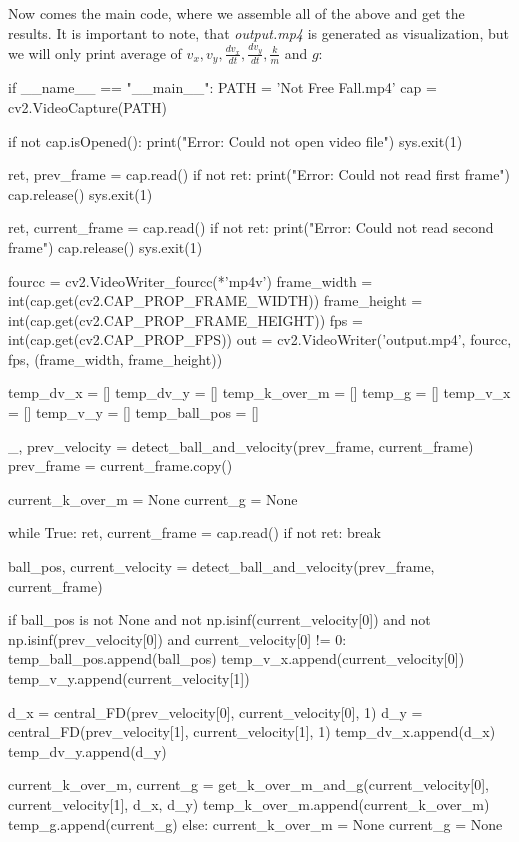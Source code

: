 \documentclass{article}
\begin{document}
Now comes the main code, where we assemble all of the above and get the results. It is important to note, that \textit{output.mp4} is generated as visualization, but we will only print average of $v_x, v_y, \frac{dv_x}{dt}, \frac{dv_y}{dt}, \frac{k}{m}$ and $g$:
\begin{python}
if __name__ == "__main__":
	PATH = 'Not Free Fall.mp4'
	cap = cv2.VideoCapture(PATH)
	
	if not cap.isOpened():
		print("Error: Could not open video file")
		sys.exit(1)
	
	ret, prev_frame = cap.read()
	if not ret:
		print("Error: Could not read first frame")
		cap.release()
		sys.exit(1)
	
	ret, current_frame = cap.read()
	if not ret:
		print("Error: Could not read second frame")
		cap.release()
		sys.exit(1)
	
	fourcc = cv2.VideoWriter_fourcc(*'mp4v')
	frame_width = int(cap.get(cv2.CAP_PROP_FRAME_WIDTH))
	frame_height = int(cap.get(cv2.CAP_PROP_FRAME_HEIGHT))
	fps = int(cap.get(cv2.CAP_PROP_FPS))
	out = cv2.VideoWriter('output.mp4', fourcc, fps, (frame_width, frame_height))
	
	temp_dv_x = []
	temp_dv_y = []
	temp_k_over_m = []
	temp_g = []
	temp_v_x = []
	temp_v_y = []
	temp_ball_pos = []
	
	_, prev_velocity = detect_ball_and_velocity(prev_frame, current_frame)
	prev_frame = current_frame.copy()
	
	current_k_over_m = None
	current_g = None
	
	while True:
		ret, current_frame = cap.read()
		if not ret:
			break
		
		ball_pos, current_velocity = detect_ball_and_velocity(prev_frame, current_frame)
		
		if ball_pos is not None and not np.isinf(current_velocity[0]) and not np.isinf(prev_velocity[0]) and current_velocity[0] != 0:
			temp_ball_pos.append(ball_pos)
			temp_v_x.append(current_velocity[0])
			temp_v_y.append(current_velocity[1])
			
			d_x = central_FD(prev_velocity[0], current_velocity[0], 1)
			d_y = central_FD(prev_velocity[1], current_velocity[1], 1)
			temp_dv_x.append(d_x)
			temp_dv_y.append(d_y)
		
			current_k_over_m, current_g = get_k_over_m_and_g(current_velocity[0], current_velocity[1], d_x, d_y)
			temp_k_over_m.append(current_k_over_m)
			temp_g.append(current_g)
		else:
			current_k_over_m = None
			current_g = None
	

\end{python}
\end{document}
